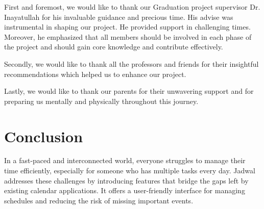 \documentclass[12pt,a4paper,twoside]{report}
\begin{document}
\begin{singlespace}
    \begin{justify}
        First and foremost, we would like to thank our Graduation project supervisor Dr. Inayatullah for his invaluable guidance and precious time. His advise was instrumental in shaping our project. He provided support in challenging times. Moreover, he emphasized that all members should be involved in each phase of the project and should gain core knowledge and contribute effectively.

        Secondly, we would like to thank all the professors and friends for their insightful recommendations which helped us to enhance our project.

        Lastly, we would like to thank our parents for their unwavering support and for preparing us mentally and physically throughout this journey.
    \end{justify}

    \cleardoublepage

    \tableofcontents

    \cleardoublepage

    \listoffigures

    \cleardoublepage

    \listoftables

    \glsaddall
    \printglossary[title={List of Abbreviations and Terminology}]

\end{singlespace}

\cleardoublepage












\chapter*{Conclusion}

In a fast-paced and interconnected world, everyone struggles to manage their time efficiently, especially for someone who has multiple tasks every day. Jadwal addresses these challenges by introducing features that bridge the gaps left by existing calendar applications. It offers a user-friendly interface for managing schedules and reducing the risk of missing important events.
\end{document}
